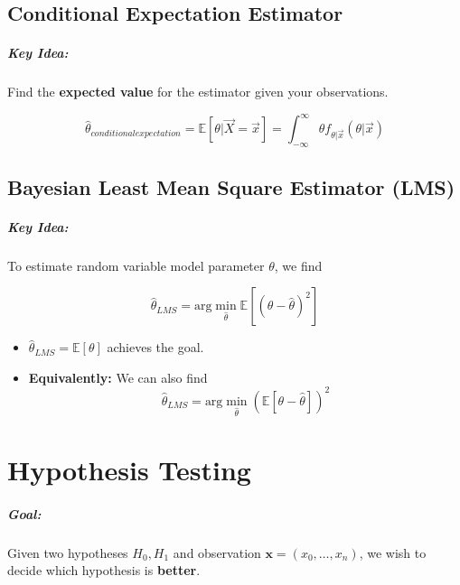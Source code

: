 \documentclass[a4paper,12pt]{report}
\begin{document}
\section{Conditional Expectation Estimator}

\paragraph{Key Idea: } Find the \textbf{expected value} for the estimator given your observations.

\begin{equation}
\hat\theta_{conditional expectation} = \mathbb E[\theta | \vec X = \vec x] = \int_{-\infty}^\infty \theta f_{\theta|\vec x}(\theta | \vec x)
\end{equation}


\section{Bayesian Least Mean Square Estimator (LMS)}

\paragraph{Key Idea: } To estimate random variable model parameter $\theta$, we find

\begin{equation}
\hat \theta_{LMS} = \text{arg}\min_{\hat \theta} \mathbb E [(\theta-\hat\theta)^2]
\end{equation}

\begin{itemize}
\item $\hat \theta_{LMS} = \mathbb E[\theta]$ achieves the goal.
\item \textbf{Equivalently: } We can also find 
\begin{equation}
\hat\theta_{LMS} = \text{arg}\min_{\hat \theta} (\mathbb E[\theta-\hat\theta])^2
\end{equation}
\end{itemize}


\chapter{Hypothesis Testing}

\paragraph{Goal: } Given two hypotheses $H_0, H_1$ and observation $\pmb x = (x_0, \dots, x_n)$, we wish to decide which hypothesis is \textbf{better}.
\end{document}

